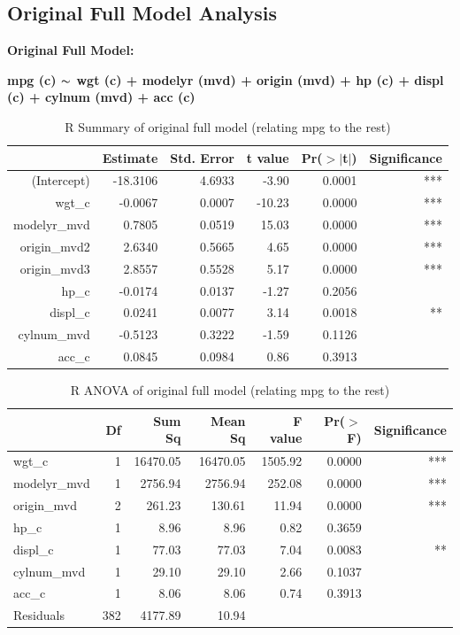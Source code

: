 \documentclass{article}
\newcommand{\mt}[1]{\ensuremath{#1}}
\newcommand{\tl}{\mt{\thicksim} }
\begin{document}
\subsection{Original Full Model Analysis}

\textbf{Original Full Model:}

\textbf{mpg (c) \tl wgt (c) + modelyr (mvd) + origin (mvd) + hp (c) + displ (c) + cylnum (mvd) + acc (c)}

\begin{table}[ht]
\centering
\begin{tabular}{rrrrrr}
  \hline
 & Estimate & Std. Error & t value & Pr($>$$|$t$|$) & Significance \\ 
  \hline
(Intercept) & -18.3106 & 4.6933 & -3.90 & 0.0001 & *** \\ 
  wgt\_c & -0.0067 & 0.0007 & -10.23 & 0.0000 & ***  \\ 
  modelyr\_mvd & 0.7805 & 0.0519 & 15.03 & 0.0000 & ***  \\ 
  origin\_mvd2 & 2.6340 & 0.5665 & 4.65 & 0.0000 & ***  \\ 
  origin\_mvd3 & 2.8557 & 0.5528 & 5.17 & 0.0000 & ***  \\ 
  hp\_c & -0.0174 & 0.0137 & -1.27 & 0.2056 & \\ 
  displ\_c & 0.0241 & 0.0077 & 3.14 & 0.0018 & ** \\ 
  cylnum\_mvd & -0.5123 & 0.3222 & -1.59 & 0.1126 & \\ 
  acc\_c & 0.0845 & 0.0984 & 0.86 & 0.3913 & \\ 
   \hline
\end{tabular}
\caption{R Summary of original full model (relating mpg to the rest)}
\label{tab:myfirsttable}
\end{table}


\begin{table}[ht]
\centering
\begin{tabular}{lrrrrrr}
  \hline
 & Df & Sum Sq & Mean Sq & F value & Pr($>$F) & Significance\\ 
  \hline
wgt\_c & 1 & 16470.05 & 16470.05 & 1505.92 & 0.0000 & ***  \\ 
  modelyr\_mvd & 1 & 2756.94 & 2756.94 & 252.08 & 0.0000 & ***  \\ 
  origin\_mvd & 2 & 261.23 & 130.61 & 11.94 & 0.0000 & ***  \\ 
  hp\_c & 1 & 8.96 & 8.96 & 0.82 & 0.3659 & \\ 
  displ\_c & 1 & 77.03 & 77.03 & 7.04 & 0.0083 & ** \\ 
  cylnum\_mvd & 1 & 29.10 & 29.10 & 2.66 & 0.1037 & \\ 
  acc\_c & 1 & 8.06 & 8.06 & 0.74 & 0.3913 &  \\ 
  Residuals & 382 & 4177.89 & 10.94 &  & & \\ 
   \hline
\end{tabular}
\caption{R ANOVA of original full model (relating mpg to the rest)}
\label{tab:myfirsttable}
\end{table}
\end{document}
